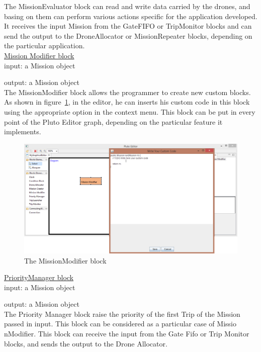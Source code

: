 The MissionEvaluator block can read and write data carried by the drones, and basing on them can perform various actions specific for the application developed.
It receives the input Mission from the GateFIFO or TripMonitor blocks and can send the output to the DroneAllocator or MissionRepeater blocks, depending on the particular application.
\\

\underline{Mission Modifier block}\label{mm}
\\

input: a Mission object

output: a Mission object
\\

The MissionModifier block allows the programmer to create new custom blocks.
As shown in figure~\ref{fig:missionmodifier}, in the editor, he can inserts his custom code in this block using the appropriate option in the context menu.
This block can be put in every point of the Pluto Editor graph, depending on the particular feature it implements.
\\

\begin{figure}[H]
\centering
\includegraphics[width=\linewidth]
{pictures/MissionModifier.png}
  \caption{The MissionModifier block}
  \label{fig:missionmodifier}
\end{figure}

\underline{PriorityManager block}
\\

input: a Mission object

output: a Mission object
\\

The Priority Manager block raise the priority of the first Trip of the Mission passed in input.
This block can be considered as a particular case of Missio nModifier. 
This block can receive the input from the Gate Fifo or Trip Monitor blocks, and sends the output to the Drone Allocator.
\\

